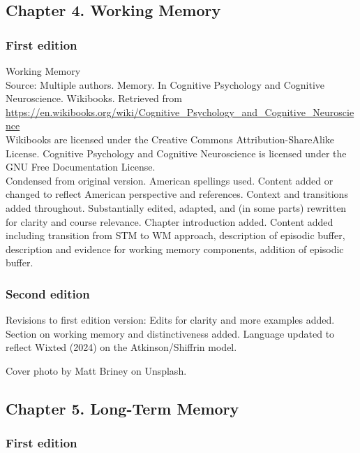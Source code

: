 \documentclass[
]{krantz}
\begin{document}
\subsection*{Chapter 4. Working Memory}\label{chapter-4.-working-memory}


\subsubsection*{First edition}\label{first-edition-4}


Working Memory\\
Source: Multiple authors. Memory. In Cognitive Psychology and Cognitive Neuroscience. Wikibooks. Retrieved from \url{https://en.wikibooks.org/wiki/Cognitive_Psychology_and_Cognitive_Neuroscience}\\
Wikibooks are licensed under the Creative Commons Attribution-ShareAlike License.
Cognitive Psychology and Cognitive Neuroscience is licensed under the GNU Free Documentation License.\\
Condensed from original version. American spellings used. Content added or changed to reflect American perspective and references. Context and transitions added throughout. Substantially edited, adapted, and (in some parts) rewritten for clarity and course relevance. Chapter introduction added. Content added including transition from STM to WM approach, description of episodic buffer, description and evidence for working memory components, addition of episodic buffer.

\subsubsection*{Second edition}\label{second-edition-4}


Revisions to first edition version: Edits for clarity and more examples added. Section on working memory and distinctiveness added. Language updated to reflect Wixted (2024) on the Atkinson/Shiffrin model.

Cover photo by Matt Briney on Unsplash.

\subsection*{Chapter 5. Long-Term Memory}\label{chapter-5.-long-term-memory}


\subsubsection*{First edition}\label{first-edition-5}
\end{document}
